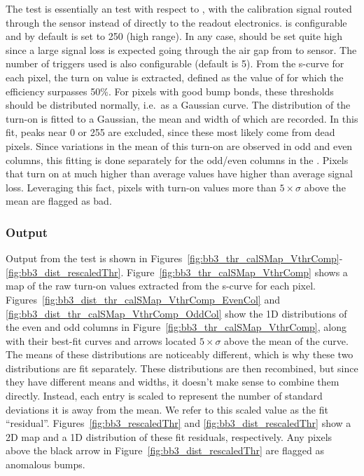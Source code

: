 The \bb test is essentially an \scurves test with respect to \vthrcomp, 
with the calibration signal routed through the sensor instead of directly to the readout electronics.
\vcal is configurable and by default is set to 250 (high range).
In any case, \vcal should be set quite high since a large signal loss is expected going through the air gap from \roc to sensor.
The number of triggers used is also configurable (default is 5).
From the \vthrcomp s-curve for each pixel, the turn on value is extracted, 
defined as the value of \vthrcomp for which the efficiency surpasses 50\%.
For pixels with good bump bonds, these thresholds should be distributed normally, i.e.~as a Gaussian curve.
The distribution of the \vthrcomp turn-on is fitted to a Gaussian, the mean and width of which are recorded.
In this fit, peaks near 0 or 255 are excluded, since these most likely come from dead pixels.
Since variations in the mean of this turn-on are observed in odd and even columns, 
this fitting is done separately for the odd/even columns in the \roc.
Pixels that turn on at much higher than average \vthrcomp values have higher than average signal loss.
Leveraging this fact, pixels with turn-on values more than $5\times\sigma$ above the mean are flagged as bad.

\subsubsection{Output}

Output from the \bb test is shown in Figures~\ref{fig:bb3_thr_calSMap_VthrComp}-\ref{fig:bb3_dist_rescaledThr}.
Figure~\ref{fig:bb3_thr_calSMap_VthrComp} shows a \roc map of the raw turn-on values extracted from the \vthrcomp s-curve for each pixel.
Figures~\ref{fig:bb3_dist_thr_calSMap_VthrComp_EvenCol} and \ref{fig:bb3_dist_thr_calSMap_VthrComp_OddCol} 
show the 1D distributions of the even and odd columns in Figure~\ref{fig:bb3_thr_calSMap_VthrComp}, 
along with their best-fit curves and arrows located $5\times\sigma$ above the mean of the curve.
The means of these distributions are noticeably different, which is why these two distributions are fit separately.
These distributions are then recombined, but since they have different means and widths,
it doesn't make sense to combine them directly.
Instead, each entry is scaled to represent the number of standard deviations it is away from the mean.
We refer to this scaled value as the fit ``residual''.
Figures~\ref{fig:bb3_rescaledThr} and \ref{fig:bb3_dist_rescaledThr} show a 2D \roc map and a 1D distribution of these fit residuals, respectively.
Any pixels above the black arrow in Figure~\ref{fig:bb3_dist_rescaledThr} are flagged as anomalous bumps.

